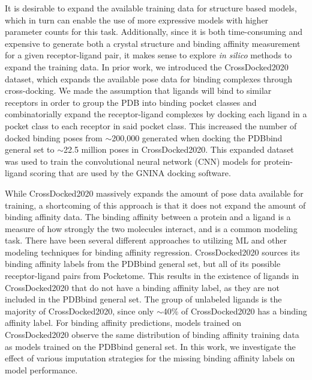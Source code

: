 \documentclass[journal=jcim,manuscript=article]{achemso}
\begin{document}
It is desirable to expand the available training data for structure based models, which in turn can enable the use of more expressive models with higher parameter counts for this task.
Additionally, since it is both time-consuming and expensive to generate both a crystal structure and binding affinity measurement for a given receptor-ligand pair, it makes sense to explore \textit{in silico} methods to expand the training data.
In prior work, we introduced the CrossDocked2020 dataset, which expands the available pose data for binding complexes through cross-docking\cite{crossdocked2020}.
We made the assumption that ligands will bind to similar receptors in order to group the PDB into binding pocket classes and combinatorially expand the receptor-ligand complexes by docking each ligand in a pocket class to each receptor in said pocket class.
This increased the number of docked binding poses from $\sim$200,000 generated when docking the PDBbind general set to $\sim$22.5 million poses in CrossDocked2020\cite{crossdocked2020}. This expanded dataset was used to train the convolutional neural network (CNN) models for protein-ligand scoring\cite{ragoza2017protein} that are used by the GNINA docking software.\cite{mcnutt2021gnina}

While CrossDocked2020 massively expands the amount of pose data available for training, a shortcoming of this approach is that it does not expand the amount of binding affinity data.
The binding affinity between a protein and a ligand is a measure of how strongly the two molecules interact, and is a common modeling task.
There have been several different approaches to utilizing ML and other modeling techniques for binding affinity regression.\cite{roccoBAreview,zhao2022brief,gu2023protein,crossdocked2020,kdeep,onionnet,pafnuncy,bapa,fusionAff,cang2018representability,NNscore, RFscore,DLscore}
CrossDocked2020 sources its binding affinity labels from the PDBbind general set, but all of its possible receptor-ligand pairs from Pocketome.\cite{pocketome}
This results in the existence of ligands in CrossDocked2020 that do not have a binding affinity label, as they are not included in the PDBbind general set.
The group of unlabeled ligands is the majority of CrossDocked2020, since only $\sim$40\% of CrossDocked2020 has a binding affinity label.
For binding affinity predictions, models trained on CrossDocked2020 observe the same distribution of binding affinity training data as models trained on the PDBbind general set.
In this work, we investigate the effect of various imputation strategies for the missing binding affinity labels on model performance.
\end{document}
